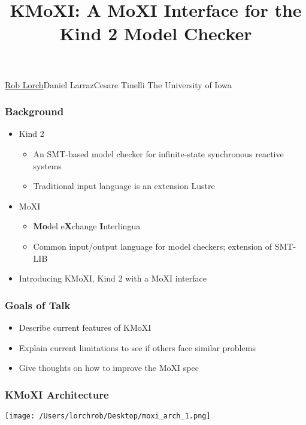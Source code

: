 \documentclass[11pt,xcolor={dvipsnames},hyperref={pdftex,pdfpagemode=UseNone,hidelinks,pdfdisplaydoctitle=true},usepdftitle=false]{beamer}
\begin{document}

\title{KMoXI: A MoXI Interface for the Kind 2 Model Checker}

\information
%  
%
{\underline{Rob Lorch}\quad Daniel Larraz\quad Cesare Tinelli
\newline \newline   
The University of Iowa
}
%

\frame{\titlepage}

\begin{frame} 
    \frametitle{Background} \pause
    \begin{itemize}
        \item Kind 2
        \begin{itemize}
            \item An SMT-based model checker for infinite-state synchronous reactive systems
            \item Traditional input language is an extension Lustre
        \end{itemize}
        \pause
        \item MoXI
        \begin{itemize}
            \item \textbf{Mo}del e\textbf{X}change \textbf{I}nterlingua
            \item Common input/output language for model checkers; extension of SMT-LIB
        \end{itemize}
        \pause
        \item Introducing KMoXI, Kind 2 with a MoXI interface
    \end{itemize}
\end{frame}

\begin{frame} 
    \frametitle{Goals of Talk} \pause
    \begin{itemize}
        \item Describe current features of KMoXI \pause
        \item Explain current limitations to see if others face similar problems \pause 
        \item Give thoughts on how to improve the MoXI spec  
    \end{itemize}
\end{frame}

\begin{frame} 
    \frametitle{KMoXI Architecture}\pause
    \texttt{[image: /Users/lorchrob/Desktop/moxi\_arch\_1.png]}
\end{frame}
\end{document}
